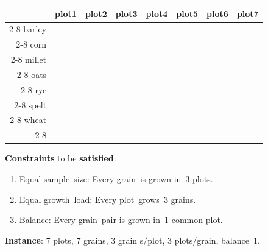 \documentclass{cons-beamer}
\newcommand{\VarSem}{sample}           \newcommand{\BlkSem}{growth}
\newcommand{\Variety}{grain}           \newcommand{\Block}{\textnormal{plot}}
\newcommand{\VarBlk}{grown in}         \newcommand{\BlkVar}{grows}
\newcommand{\VarOne}{barley}           \newcommand{\BlkOne}{\Block1}
\newcommand{\VarTwo}{corn}             \newcommand{\BlkTwo}{\Block2}
\newcommand{\VarThree}{millet}         \newcommand{\BlkThree}{\Block3}
\newcommand{\VarFour}{oats}            \newcommand{\BlkFour}{\Block4}
\newcommand{\VarFive}{rye}             \newcommand{\BlkFive}{\Block5}
\newcommand{\VarSix}{spelt}            \newcommand{\BlkSix}{\Block6}
\newcommand{\VarSeven}{wheat}          \newcommand{\BlkSeven}{\Block7}
\begin{document}
\begin{frame}
	\begin{example}
		\begin{table} \small
			\begin{tabular}{r|c|c|c|c|c|c|c|}
				\multicolumn{1}{r}{} & \multicolumn{1}{c}{\BlkOne}
				& \multicolumn{1}{c}{\BlkTwo} & \multicolumn{1}{c}{\BlkThree}
				& \multicolumn{1}{c}{\BlkFour} & \multicolumn{1}{c}{\BlkFive}
				& \multicolumn{1}{c}{\BlkSix} & \multicolumn{1}{c}{\BlkSeven} \\
				\cline{2-8}
				\VarOne   & {} & {} & {} & {} & {} & {} & {} \\ \cline{2-8}
				\VarTwo   & {} & {} & {} & {} & {} & {} & {} \\ \cline{2-8}
				\VarThree & {} & {} & {} & {} & {} & {} & {} \\ \cline{2-8}
				\VarFour  & {} & {} & {} & {} & {} & {} & {} \\ \cline{2-8}
				\VarFive  & {} & {} & {} & {} & {} & {} & {} \\ \cline{2-8}
				\VarSix   & {} & {} & {} & {} & {} & {} & {} \\ \cline{2-8}
				\VarSeven & {} & {} & {} & {} & {} & {} & {} \\
				\cline{2-8}
			\end{tabular}
		\end{table}
		\textbf{Constraints} to be \textbf{satisfied}:
		\begin{enumerate}
			\item Equal \VarSem\ size: Every \Variety\ is \VarBlk\ 3 \Block s.
			\item Equal \BlkSem\ load: Every \Block\ \BlkVar\ 3 \Variety s.
			\item Balance: Every \Variety\ pair is \VarBlk\ 1 common \Block.
		\end{enumerate}
	\end{example}
	\textbf{Instance}: $7$ \Block s, $7$ \Variety s, $3$ \Variety
	s/\Block, $3$ \Block s/\Variety, balance~$1$.
\end{frame}
\end{document}
